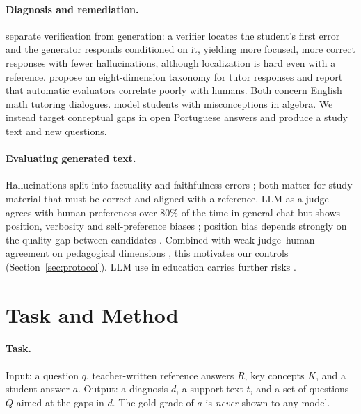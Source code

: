 \documentclass[11pt]{article}
\begin{document}
\paragraph{Diagnosis and remediation.} \citet{daheim2024} separate verification from generation: a verifier locates the student's first error and the generator responds conditioned on it, yielding more focused, more correct responses with fewer hallucinations, although localization is hard even with a reference. \citet{maurya2025} propose an eight-dimension taxonomy for tutor responses and report that automatic evaluators correlate poorly with humans. Both concern English math tutoring dialogues. \citet{sonkar2024} model students with misconceptions in algebra. We instead target conceptual gaps in open Portuguese answers and produce a study text and new questions.

\paragraph{Evaluating generated text.} Hallucinations split into factuality and faithfulness errors \citep{huang2025}; both matter for study material that must be correct and aligned with a reference. LLM-as-a-judge agrees with human preferences over 80\% of the time in general chat but shows position, verbosity and self-preference biases \citep{zheng2023}; position bias depends strongly on the quality gap between candidates \citep{shi2025}. Combined with weak judge--human agreement on pedagogical dimensions \citep{maurya2025}, this motivates our controls (Section~\ref{sec:protocol}). LLM use in education carries further risks \citep{kasneci2023}.

\section{Task and Method}

\paragraph{Task.} Input: a question $q$, teacher-written reference answers $R$, key concepts $K$, and a student answer $a$. Output: a diagnosis $d$, a support text $t$, and a set of questions $Q$ aimed at the gaps in $d$. The gold grade of $a$ is \emph{never} shown to any model.
\end{document}
